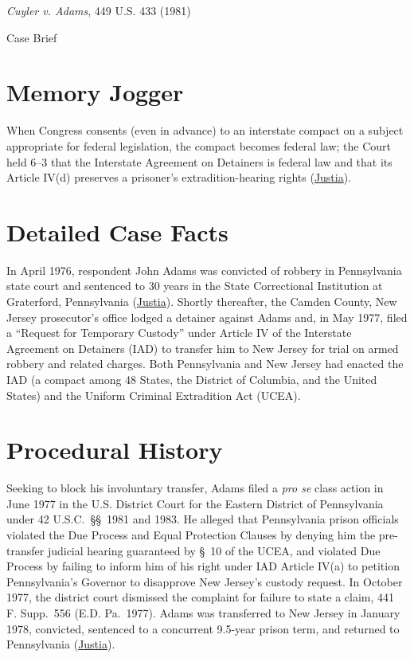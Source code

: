 \documentclass[12pt]{article}
\begin{document}
\begin{center}
{\LARGE \textit{Cuyler v. Adams}, 449 U.S. 433 (1981)\par}
\vspace{0.8em}
{\large Case Brief\par}
\end{center}
\vspace{1em}

\section{Memory Jogger}
When Congress consents (even in advance) to an interstate compact on a subject appropriate for federal legislation, the compact becomes federal law; the Court held 6--3 that the Interstate Agreement on Detainers is federal law and that its Article IV(d) preserves a prisoner's extradition-hearing rights (\href{https://supreme.justia.com/cases/federal/us/449/433/}{Justia}).

\section{Detailed Case Facts}
In April 1976, respondent John Adams was convicted of robbery in Pennsylvania state court and sentenced to 30 years in the State Correctional Institution at Graterford, Pennsylvania (\href{https://supreme.justia.com/cases/federal/us/449/433/}{Justia}). Shortly thereafter, the Camden County, New Jersey prosecutor's office lodged a detainer against Adams and, in May 1977, filed a ``Request for Temporary Custody'' under Article IV of the Interstate Agreement on Detainers (IAD) to transfer him to New Jersey for trial on armed robbery and related charges. Both Pennsylvania and New Jersey had enacted the IAD (a compact among 48 States, the District of Columbia, and the United States) and the Uniform Criminal Extradition Act (UCEA).

\section{Procedural History}
Seeking to block his involuntary transfer, Adams filed a \textit{pro se} class action in June 1977 in the U.S. District Court for the Eastern District of Pennsylvania under 42 U.S.C.\ \S\S\ 1981 and 1983. He alleged that Pennsylvania prison officials violated the Due Process and Equal Protection Clauses by denying him the pre-transfer judicial hearing guaranteed by \S\ 10 of the UCEA, and violated Due Process by failing to inform him of his right under IAD Article IV(a) to petition Pennsylvania's Governor to disapprove New Jersey's custody request. In October 1977, the district court dismissed the complaint for failure to state a claim, 441 F. Supp.\ 556 (E.D. Pa.\ 1977). Adams was transferred to New Jersey in January 1978, convicted, sentenced to a concurrent 9.5-year prison term, and returned to Pennsylvania (\href{https://supreme.justia.com/cases/federal/us/449/433/}{Justia}).
\end{document}
